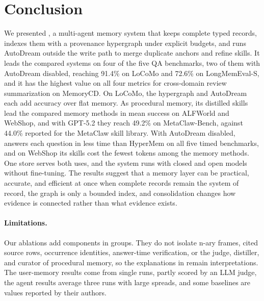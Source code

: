 \section{Conclusion}
\label{sec:conclusion}

We presented \ours, a multi-agent memory system that keeps complete typed
records, indexes them with a provenance hypergraph under explicit budgets, and
runs AutoDream outside the write path to merge duplicate anchors and refine
skills. It leads the compared systems on four of the five QA benchmarks, two of
them with AutoDream disabled, reaching 91.4\% on LoCoMo and 72.6\% on
LongMemEval-S, and it has the highest value on all four metrics for
cross-domain review summarization on MemoryCD. On LoCoMo, the hypergraph and
AutoDream each add accuracy over flat memory. As procedural memory, its
distilled skills lead the compared memory methods in mean success on ALFWorld
and WebShop, and with GPT-5.2 they reach 49.2\% on MetaClaw-Bench, against
44.0\% reported for the MetaClaw skill library. With AutoDream disabled, \ours
answers each question in less time than HyperMem on all five timed benchmarks,
and on WebShop its skills cost the fewest tokens among the memory methods. One
store serves both uses, and the system runs with closed and open models without
fine-tuning. The results suggest that a memory layer can be
practical, accurate, and efficient at once when complete records remain the
system of record, the graph is only a bounded index, and consolidation changes
how evidence is connected rather than what evidence exists. 

\paragraph{Limitations.}
Our ablations add components in groups. They do not isolate n-ary frames,
cited source rows, occurrence identities, answer-time verification, or the
judge, distiller, and curator of procedural memory, so the explanations in 
remain interpretations. The user-memory results come from single runs, partly
scored by an LLM judge, the agent results average three runs with large
spreads, and some baselines are values reported by their authors. 

